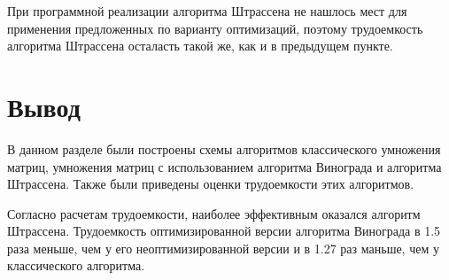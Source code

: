 При программной реализации алгоритма Штрассена не нашлось мест для применения предложенных по варианту оптимизаций, поэтому трудоемкость алгоритма Штрассена осталасть такой же, как и в предыдущем пункте.

\section*{Вывод}

В данном разделе были построены схемы алгоритмов классического умножения матриц, умножения матриц с использованием алгоритма Винограда и алгоритма Штрассена. Также были приведены оценки трудоемкости этих алгоритмов.

Согласно расчетам трудоемкости, наиболее эффективным оказался алгоритм Штрассена. Трудоемкость оптимизированной версии алгоритма Винограда в 1.5 раза меньше, чем у его неоптимизированной версии и в 1.27 раз маньше, чем у классического алгоритма. 


